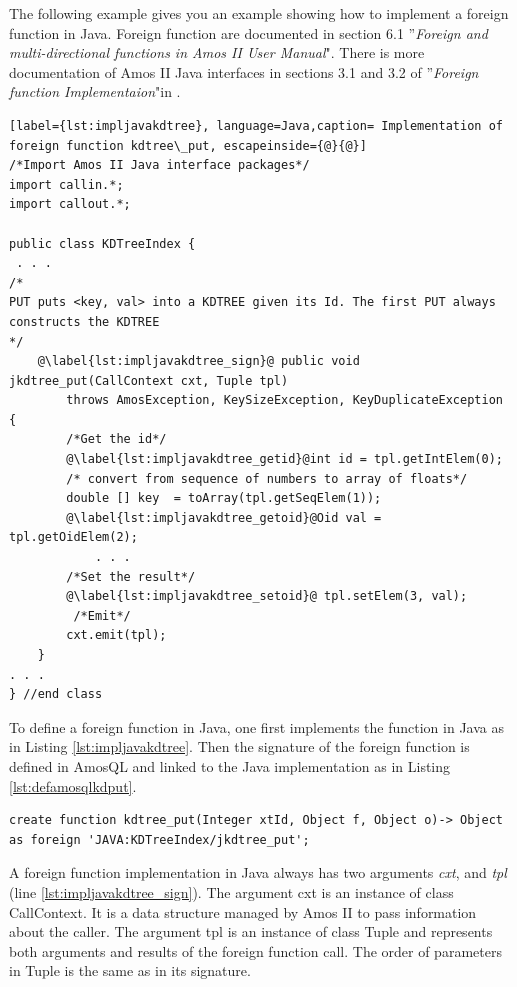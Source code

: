 \documentclass[12pt]{article}
\begin{document}
The following example gives you an example showing how to implement a
foreign function in Java. Foreign function are documented in section
6.1 ''\emph{Foreign and multi-directional functions in Amos II User
Manual}"\cite{AmosII}. There is more documentation of Amos II Java
interfaces in sections 3.1 and 3.2 of ''\emph{Foreign function
Implementaion}"in \cite{AmosIIJava}.\\

\begin{lstlisting}[label={lst:impljavakdtree}, language=Java,caption= Implementation of foreign function kdtree\_put, escapeinside={@}{@}]
/*Import Amos II Java interface packages*/
import callin.*;
import callout.*;

public class KDTreeIndex {
 . . .
/*
PUT puts <key, val> into a KDTREE given its Id. The first PUT always constructs the KDTREE
*/
	@\label{lst:impljavakdtree_sign}@ public void jkdtree_put(CallContext cxt, Tuple tpl)
		throws AmosException, KeySizeException, KeyDuplicateException {
		/*Get the id*/
		@\label{lst:impljavakdtree_getid}@int id = tpl.getIntElem(0);
		/* convert from sequence of numbers to array of floats*/
		double [] key  = toArray(tpl.getSeqElem(1));
		@\label{lst:impljavakdtree_getoid}@Oid val =  tpl.getOidElem(2);
			. . .
		/*Set the result*/
		@\label{lst:impljavakdtree_setoid}@ tpl.setElem(3, val);
		 /*Emit*/
		cxt.emit(tpl);
	}
. . .
} //end class
\end{lstlisting}

To define a foreign function in Java, one first implements the
function in Java as in Listing \ref{lst:impljavakdtree}. Then the
signature of the foreign function is defined in AmosQL and linked to
the Java implementation as in Listing
\ref{lst:defamosqlkdput}. 

\begin{lstlisting}[caption={Definition of foreign function kdtree\_put in AMOSQL},label={lst:defamosqlkdput}]
 create function kdtree_put(Integer xtId, Object f, Object o)-> Object as foreign 'JAVA:KDTreeIndex/jkdtree_put';
\end{lstlisting}

A foreign function implementation in Java always has two arguments
\emph{cxt}, and \emph{tpl} (line \ref{lst:impljavakdtree_sign}). The
argument cxt is an instance of class CallContext. It is a data
structure managed by Amos II to pass information about the caller. The
argument tpl is an instance of class Tuple and represents both
arguments and results of the foreign function call. The order of
parameters in Tuple is the same as in its signature.
\end{document}
